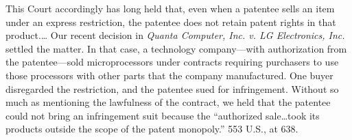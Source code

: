 This Court accordingly has long held that, even when a patentee sells an item
under an express restriction, the patentee does not retain patent rights in that
product.\ldots
%
%
Our recent decision in \textit{Quanta Computer,
Inc. v. LG Electronics, Inc.} settled the matter. In that case, a
technology company---with authorization from the patentee---sold microprocessors
under contracts requiring purchasers to use those processors with other parts
that the company manufactured. One buyer disregarded the restriction, and the
patentee sued for infringement. Without so much as mentioning the lawfulness of
the contract, we held that the patentee could not bring an infringement suit
because the ``authorized sale\ldots took its products outside the scope of the
patent monopoly.'' 553 U.S., at 638.

